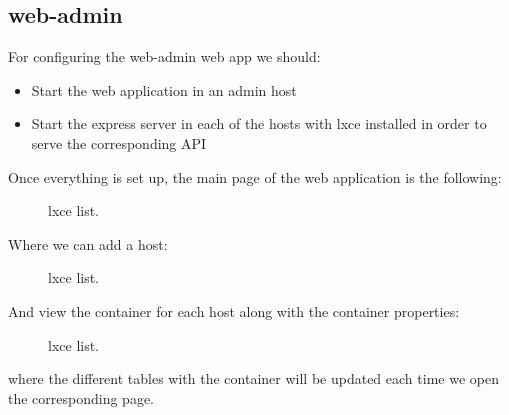 
\subsection{web-admin}
For configuring the web-admin web app we should:
\begin{itemize}
	\item{Start the web application in an admin host}
	\item{Start the express server in each of the hosts with lxce installed in order to serve the corresponding API}
\end{itemize}

Once everything is set up, the main page of the web application is the following:
\begin{figure}[H]
\label{fig:web-admin}
\centering
{}
\caption[Prototype setup]{\footnotesize{lxce list.}}
\end{figure}

Where we can add a host:
\begin{figure}[H]
\label{fig:lxce list}
\centering
{}
\caption[Prototype setup]{\footnotesize{lxce list.}}
\end{figure}

\newpage
And view the container for each host along with the container properties:
\begin{figure}[H]
\label{fig:lxce list}
\centering
{}
\caption[Prototype setup]{\footnotesize{lxce list.}}
\end{figure}

where the different tables with the container will be updated each time we open the corresponding page.

